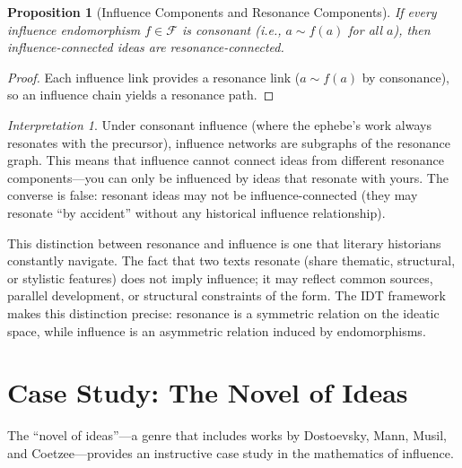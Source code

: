 \documentclass[11pt,openany]{book}
\theoremstyle{definition}
\theoremstyle{plain}
\newtheorem{proposition}[axiom]{Proposition}
\theoremstyle{remark}
\newtheorem{interpretation}[axiom]{Interpretation}
\newcommand{\res}{\sim}                      %
\begin{document}
\begin{proposition}[Influence Components and Resonance Components]
If every influence endomorphism $f \in \mathcal{F}$ is consonant (i.e., $a \res f(a)$ for all $a$), then influence-connected ideas are resonance-connected.
\end{proposition}

\begin{proof}
Each influence link provides a resonance link ($a \res f(a)$ by consonance), so an influence chain yields a resonance path.
\end{proof}

\begin{interpretation}
Under consonant influence (where the ephebe's work always resonates with the precursor), influence networks are subgraphs of the resonance graph. This means that influence cannot connect ideas from different resonance components---you can only be influenced by ideas that resonate with yours. The converse is false: resonant ideas may not be influence-connected (they may resonate ``by accident'' without any historical influence relationship).

This distinction between resonance and influence is one that literary historians constantly navigate. The fact that two texts resonate (share thematic, structural, or stylistic features) does not imply influence; it may reflect common sources, parallel development, or structural constraints of the form. The IDT framework makes this distinction precise: resonance is a symmetric relation on the ideatic space, while influence is an asymmetric relation induced by endomorphisms.
\end{interpretation}

\section{Case Study: The Novel of Ideas}

The ``novel of ideas''---a genre that includes works by Dostoevsky, Mann, Musil, and Coetzee---provides an instructive case study in the mathematics of influence.
\end{document}
